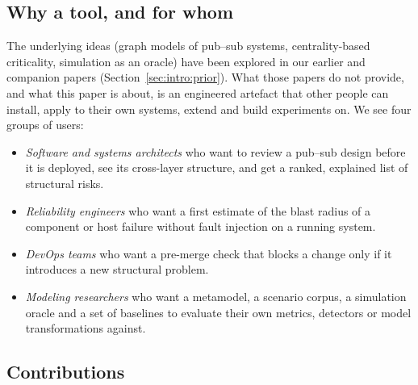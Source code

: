 \subsection{Why a tool, and for whom}
\label{sec:intro:audience}

The underlying ideas (graph models of pub--sub systems, centrality-based criticality, simulation as an oracle) have been explored in our earlier and companion papers (Section~\ref{sec:intro:prior}). What those papers do not provide, and what this paper is about, is an engineered artefact that other people can install, apply to their own systems, extend and build experiments on. We see four groups of users:
\begin{itemize}\tightlist
  \item \emph{Software and systems architects} who want to review a pub--sub design before it is deployed, see its cross-layer structure, and get a ranked, explained list of structural risks.
  \item \emph{Reliability engineers} who want a first estimate of the blast radius of a component or host failure without fault injection on a running system.
  \item \emph{DevOps teams} who want a pre-merge check that blocks a change only if it introduces a new structural problem.
  \item \emph{Modeling researchers} who want a metamodel, a scenario corpus, a simulation oracle and a set of baselines to evaluate their own metrics, detectors or model transformations against.
\end{itemize}

\subsection{Contributions}
\label{sec:intro:contributions}

